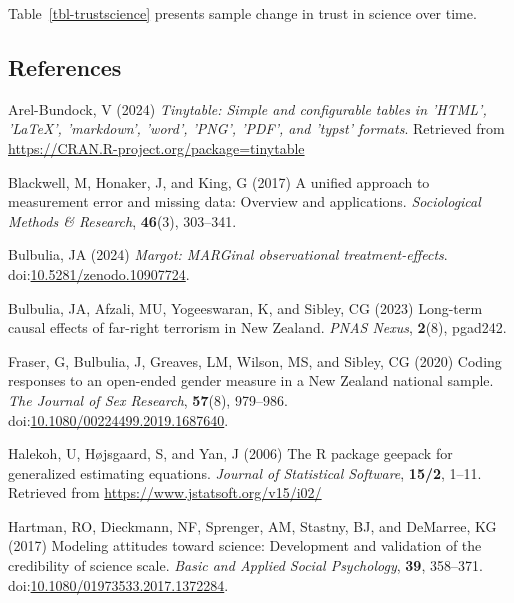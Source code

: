\documentclass[
  single column]{article}
\newlength{\cslhangindent}
\newenvironment{CSLReferences}[2] %
 {\begin{list}{}{%
  \setlength{\itemindent}{0pt}
  \setlength{\leftmargin}{0pt}
  \setlength{\parsep}{0pt}
  \ifodd #1
   \setlength{\leftmargin}{\cslhangindent}
   \setlength{\itemindent}{-1\cslhangindent}
  \fi
  \setlength{\itemsep}{#2\baselineskip}}}
 {\end{list}}
\begin{document}
Table~\ref{tbl-trustscience} presents sample change in trust in science
over time.

\newpage{}

\subsection*{References}\label{references}

\label{refs}
\begin{CSLReferences}{1}{0}
Arel-Bundock, V (2024) \emph{Tinytable: Simple and configurable tables
in 'HTML', 'LaTeX', 'markdown', 'word', 'PNG', 'PDF', and 'typst'
formats}. Retrieved from
\url{https://CRAN.R-project.org/package=tinytable}

Blackwell, M, Honaker, J, and King, G (2017) A unified approach to
measurement error and missing data: Overview and applications.
\emph{Sociological Methods \& Research}, \textbf{46}(3), 303--341.

Bulbulia, JA (2024) \emph{Margot: MARGinal observational
treatment-effects}.
doi:\href{https://doi.org/10.5281/zenodo.10907724}{10.5281/zenodo.10907724}.

Bulbulia, JA, Afzali, MU, Yogeeswaran, K, and Sibley, CG (2023)
Long-term causal effects of far-right terrorism in {N}ew {Z}ealand.
\emph{PNAS Nexus}, \textbf{2}(8), pgad242.

Fraser, G, Bulbulia, J, Greaves, LM, Wilson, MS, and Sibley, CG (2020)
Coding responses to an open-ended gender measure in a {N}ew {Z}ealand
national sample. \emph{The Journal of Sex Research}, \textbf{57}(8),
979--986.
doi:\href{https://doi.org/10.1080/00224499.2019.1687640}{10.1080/00224499.2019.1687640}.

Halekoh, U, Højsgaard, S, and Yan, J (2006) The {R} package geepack for
generalized estimating equations. \emph{Journal of Statistical
Software}, \textbf{15/2}, 1--11. Retrieved from
\url{https://www.jstatsoft.org/v15/i02/}

Hartman, RO, Dieckmann, NF, Sprenger, AM, Stastny, BJ, and DeMarree, KG
(2017) Modeling attitudes toward science: Development and validation of
the credibility of science scale. \emph{Basic and Applied Social
Psychology}, \textbf{39}, 358--371.
doi:\href{https://doi.org/10.1080/01973533.2017.1372284}{10.1080/01973533.2017.1372284}.


\end{CSLReferences}
\end{document}

